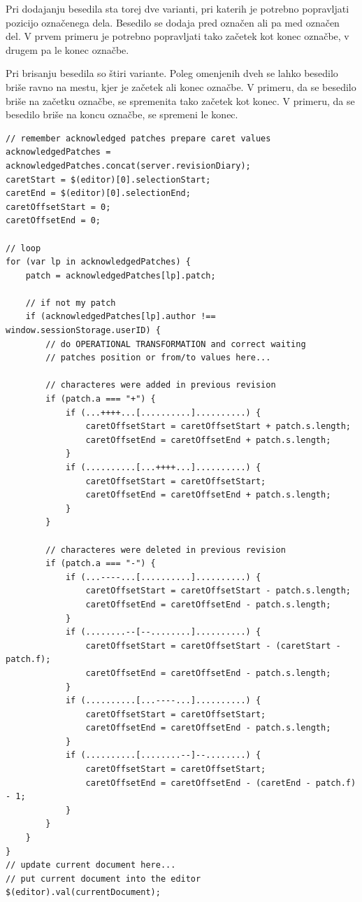 \documentclass[a4paper, 12pt, twoside]{book}
\begin{document}
Pri dodajanju besedila sta torej dve varianti, pri katerih je potrebno popravljati pozicijo označenega dela. Besedilo se dodaja pred označen ali pa med označen del. V prvem primeru je potrebno popravljati tako začetek kot konec označbe, v drugem pa le konec označbe.

Pri brisanju besedila so štiri variante. Poleg omenjenih dveh se lahko besedilo briše ravno na mestu, kjer je začetek ali konec označbe. V primeru, da se besedilo briše na začetku označbe, se spremenita tako začetek kot konec. V primeru, da se besedilo briše na koncu označbe, se spremeni le konec.\newline

\begin{lstlisting}[title={Koda 6.6: Popravljanje pozicije utripalke na strani odjemalca.}]
// remember acknowledged patches prepare caret values
acknowledgedPatches = acknowledgedPatches.concat(server.revisionDiary);
caretStart = $(editor)[0].selectionStart;
caretEnd = $(editor)[0].selectionEnd;
caretOffsetStart = 0;
caretOffsetEnd = 0;

// loop
for (var lp in acknowledgedPatches) {
    patch = acknowledgedPatches[lp].patch;

    // if not my patch
    if (acknowledgedPatches[lp].author !== window.sessionStorage.userID) {
        // do OPERATIONAL TRANSFORMATION and correct waiting
        // patches position or from/to values here...

        // characteres were added in previous revision
        if (patch.a === "+") {
            if (...++++...[..........]..........) {
                caretOffsetStart = caretOffsetStart + patch.s.length;
                caretOffsetEnd = caretOffsetEnd + patch.s.length;
            }
            if (..........[...++++...]..........) {
                caretOffsetStart = caretOffsetStart;
                caretOffsetEnd = caretOffsetEnd + patch.s.length;
            }
        }

        // characteres were deleted in previous revision
        if (patch.a === "-") {
            if (...----...[..........]..........) {
                caretOffsetStart = caretOffsetStart - patch.s.length;
                caretOffsetEnd = caretOffsetEnd - patch.s.length;
            }
            if (........--[--........]..........) {
                caretOffsetStart = caretOffsetStart - (caretStart - patch.f);
                caretOffsetEnd = caretOffsetEnd - patch.s.length;
            }
            if (..........[...----...]..........) {
                caretOffsetStart = caretOffsetStart;
                caretOffsetEnd = caretOffsetEnd - patch.s.length;
            }
            if (..........[........--]--........) {
                caretOffsetStart = caretOffsetStart;
                caretOffsetEnd = caretOffsetEnd - (caretEnd - patch.f) - 1;
            }
        }
    }
}
// update current document here...
// put current document into the editor
$(editor).val(currentDocument);


\end{lstlisting}
\end{document}
